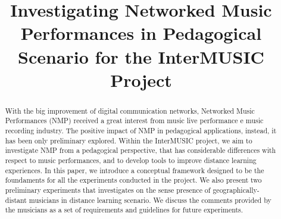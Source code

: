 \documentclass[conference]{IEEEtran}
\begin{document}
\title{Investigating Networked Music Performances in Pedagogical Scenario for the InterMUSIC Project}
\date{}%

\author{
\and
{}
\and
{}
}


\maketitle


\begin{abstract}
With the big improvement of digital communication networks, Networked Music Performances (NMP) received a great interest from music live performance e music recording industry. The positive impact of NMP in pedagogical applications, instead, it has been only preliminary explored. Within the InterMUSIC project, we aim to investigate NMP from a pedagogical perspective, that has considerable differences with respect to music performances, and to develop tools to improve distance learning experiences. In this paper, we introduce a conceptual framework designed to be the foundaments for all the experiments conducted in the project. We also present two preliminary experiments that investigates on the sense presence of geographically-distant musicians in distance learning scenario. We discuss the comments provided by the musicians as a set of requirements and guidelines for future experiments.
\end{abstract}
\end{document}
